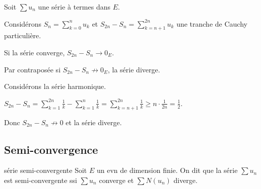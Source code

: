 \begin{proposition}{}{}
    Soit $\sum u_n$ une série à termes dans $E$.

    Considérons $\displaystyle S_n = \sum_{k = 0}^n u_k$ et $\displaystyle S_{2n} - S_n = \sum_{k = n + 1}^{2n} u_k$
    une tranche de Cauchy particulière.
    
    Si la série converge, $S_{2n} - S_n \longrightarrow 0_E$.

    Par contraposée si $S_{2n} - S_n \not \longrightarrow 0_E$, la série diverge. 
\end{proposition}


\begin{exemple}
    Considérons la série harmonique. 

    $\displaystyle S_{2n} - S_n = \sum_{k = 1}^{2n} \frac 1 k - \sum_{k = 1}^{n} \frac 1 k = \sum_{k = n + 1}^{2n} \frac 1 k \geqslant n \cdot \frac 1 {2n} = \frac 1 2$.

    Donc $S_{2n} - S_n \not \longrightarrow 0$ et la série diverge.
\end{exemple}

\subsection{Semi-convergence }

\begin{definition}{série semi-convergente}{}
    Soit $E$ un evn de dimension finie. On dit que la série $\sum u_n$ est semi-convergente 
    ssi $\sum u_n$ converge et $\sum N(u_n)$ diverge.
\end{definition}

